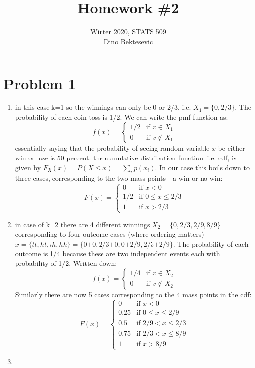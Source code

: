 \documentclass{article}
\date{{}}
\newcommand{\1}{\mathbf{1}}
\begin{document}
\title{Homework \#2}
\author{\normalsize{Winter 2020, STATS 509}\\
\normalsize{Dino Bektesevic}}
\maketitle

\section*{Problem 1}
\begin{enumerate}
	\item in this case k=1 so the winnings can only be 0 or 2/3, i.e. $X_1=\{0, 2/3\}$. The probability of each coin toss is 1/2. We can write the pmf function as:
	$$f(x) = \begin{cases} 
	        1/2 &\mbox{if } x \in X_1 \\
            0 & \mbox{if } x \notin X_1 
        \end{cases} 
    $$
    essentially saying that the probability of seeing random variable $x$ be either win or lose is 50 percent. the cumulative distribution function, i.e. cdf, is given by $F_X(x) = P(X\leq x) = \sum_i p(x_i)$. In our case this boils down to three cases, corresponding to the two mass points - a win or no win:
	$$F(x) = \begin{cases} 
	        0 &\mbox{if } x < 0 \\
	        1/2 &\mbox{if } 0 \leq x \leq 2/3 \\
            1 & \mbox{if } x > 2/3 
        \end{cases} 
    $$

    \item in case of k=2 there are 4 different winnings $X_2=\{0, 2/3, 2/9, 8/9\}$ corresponding to four outcome cases (where ordering matters) $x=\{tt, ht, th, hh\} = \{\mbox{0+0}, \mbox{2/3+0}, \mbox{0+2/9}, \mbox{2/3+2/9}\}$. The probability of each outcome is 1/4 because these are two independent events each with probability of 1/2. Written down:
    $$f(x) = \begin{cases} 
	        1/4 &\mbox{if } x \in X_2 \\
            0 & \mbox{if } x \notin X_2 
        \end{cases} 
    $$
	Similarly there are now 5 cases corresponding to the 4 mass points in the cdf:
	$$F(x) = \begin{cases} 
	        0 &\mbox{if } x < 0 \\
	        0.25 &\mbox{if } 0\leq x \leq 2/9 \\
            0.5  & \mbox{if } 2/9 < x \leq 2/3 \\
            0.75 & \mbox{if } 2/3 < x \leq 8/9 \\
            1 & \mbox{if } x > 8/9
        \end{cases} 
    $$
	
	\item 
\end{enumerate}
\end{document}
